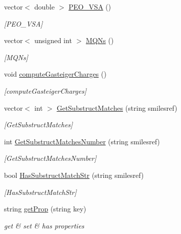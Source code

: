 \begin{DoxyCompactItemize}
vector$<$ double $>$ \mbox{\hyperlink{class_molecule_a7af6b3bc2840250b9e9aac63067a4b3d}{P\+E\+O\+\_\+\+V\+SA}} ()
\begin{DoxyCompactList}\small\item\em \mbox{[}P\+E\+O\+\_\+\+V\+SA\mbox{]} \end{DoxyCompactList}\item 
vector$<$ unsigned int $>$ \mbox{\hyperlink{class_molecule_a982b663705ea294980bdb56458dc9bd1}{M\+Q\+Ns}} ()
\begin{DoxyCompactList}\small\item\em \mbox{[}M\+Q\+Ns\mbox{]} \end{DoxyCompactList}\item 
void \mbox{\hyperlink{class_molecule_ad5c41d17dd1d3b564f85f97620cc508b}{compute\+Gasteiger\+Charges}} ()
\begin{DoxyCompactList}\small\item\em \mbox{[}compute\+Gasteiger\+Charges\mbox{]} \end{DoxyCompactList}\item 
vector$<$ int $>$ \mbox{\hyperlink{class_molecule_a39c84cac0833144106a6bb2a4adb3d38}{Get\+Substruct\+Matches}} (string smilesref)
\begin{DoxyCompactList}\small\item\em \mbox{[}Get\+Substruct\+Matches\mbox{]} \end{DoxyCompactList}\item 
int \mbox{\hyperlink{class_molecule_aaeb720434e1f35acf042b16d34fdfc29}{Get\+Substruct\+Matches\+Number}} (string smilesref)
\begin{DoxyCompactList}\small\item\em \mbox{[}Get\+Substruct\+Matches\+Number\mbox{]} \end{DoxyCompactList}\item 
bool \mbox{\hyperlink{class_molecule_a5494377b1f6db28c894941c0139496b3}{Has\+Substruct\+Match\+Str}} (string smilesref)
\begin{DoxyCompactList}\small\item\em \mbox{[}Has\+Substruct\+Match\+Str\mbox{]} \end{DoxyCompactList}\item 
string \mbox{\hyperlink{class_molecule_ad465fbdb8c43e8280e4dcf3eefac1e13}{get\+Prop}} (string key)
\begin{DoxyCompactList}\small\item\em get \& set \& has properties \end{DoxyCompactList}\item 

\end{DoxyCompactItemize}
